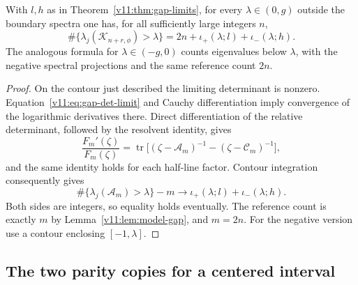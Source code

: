 \begin{corollary}
\label{v11:cor:gap-count-offset}
With $l,h$ as in Theorem~\ref{v11:thm:gap-limits}, for every
$\lambda\in(0,g)$ outside the boundary spectra one has, for all
sufficiently large integers $n$,
\begin{equation}\label{v11:eq:exact-gap-count}
 \#\{\lambda_j(\mathcal K_{n+r,\phi})>\lambda\}
       =2n+\iota_+(\lambda;l)+\iota_-(\lambda;h).
\end{equation}
The analogous formula for $\lambda\in(-g,0)$ counts eigenvalues below
$\lambda$, with the negative spectral projections and the same
reference count $2n$.
\end{corollary}
\begin{proof}
On the contour just described the limiting determinant is nonzero.
Equation~\eqref{v11:eq:gap-det-limit} and Cauchy differentiation imply
convergence of the logarithmic derivatives there.  Direct differentiation
of the relative determinant, followed by the resolvent identity, gives
\[
 \frac{F_m'(\zeta)}{F_m(\zeta)}
 =\operatorname{tr}\bigl[(\zeta-\mathscr A_m)^{-1}
                              -(\zeta-\mathscr C_m)^{-1}\bigr],
\]
and the same identity holds for each half-line factor.
Contour integration consequently gives
\[
 \#\{\lambda_j(\mathscr A_m)>\lambda\}-m
       \longrightarrow\iota_+(\lambda;l)+\iota_-(\lambda;h).
\]
Both sides are integers, so equality holds eventually.  The reference
count is exactly $m$ by Lemma~\ref{v11:lem:model-gap}, and $m=2n$.
For the negative version use a contour enclosing $[-1,\lambda]$.
\end{proof}

\subsection{The two parity copies for a centered interval}


